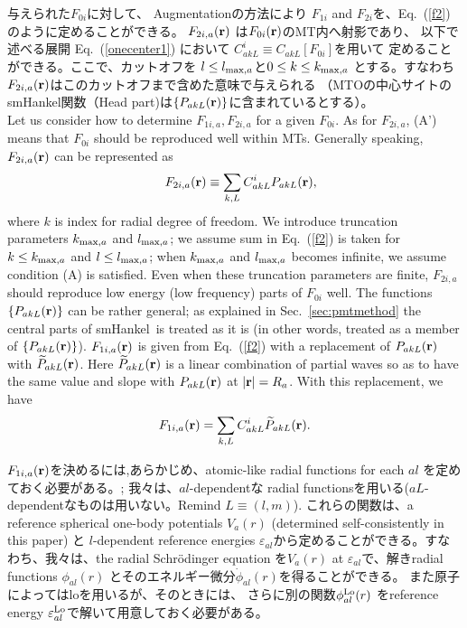 \documentclass[twocolumn,showpacs,preprintnumbers,amsmath,amssymb,floatfix]{revtex4-1}
\newcommand{\bfr}{{\bf r}}
\newcommand{\refeq}[1]{Eq.~(\ref{#1})}
\newcommand{\req}[1]{\mbox{Eq.~\!(\ref{#1})}}
\newcommand{\refsec}[1]{\mbox{Sec.~\!\ref{#1}}}
\def\eal{\varepsilon_{al}}
\def\eallo{\varepsilon^{\rm Lo}_{al}}
\def\smh{smHankel}
\def\wPakL{\widetilde{P}_{akL}}
\def\CiakL{C^i_{akL}}
\def\philo{{\phi}^{\rm Lo}_{al}}
\def\eal{\varepsilon_{al}}
\def\eallo{\varepsilon^{\rm Lo}_{al}}
\def\smh{smHankel}
\def\wPakL{\widetilde{P}_{akL}}
\def\CiakL{C^i_{akL}}
\def\philo{{\phi}^{\rm Lo}_{al}}
\begin{document}
与えられた$F_{0i}$に対して、
Augmentationの方法により $F_{1i}$ and $F_{2i}$を、\req{f2}のように定めることができる。
$F_{2i,a}(\bfr)$ は$F_{0i}(\bfr)$のMT内へ射影であり、
以下で述べる展開 \req{onecenter1} において $\CiakL\equiv C_{akL}[F_{0i}]$を用いて
定めることができる。ここで、カットオフを
$l\le l_{{\rm max},a}$と$0\le k\le k_{{\rm max},a}$ とする。すなわち
$F_{2i,a}(\bfr)$はこのカットオフまで含めた意味で与えられる
（MTOの中心サイトの\smh 関数（Head part)は$\{P_{akL}(\bfr)\}$に含まれているとする）。\\
Let us consider how to determine $F_{1i,a},F_{2i,a}$ for
a given $F_{0i}$. As for $F_{2i,a}$, (A') means that 
$F_{0i}$ should be reproduced well within MTs.
Generally speaking, $F_{2i,a}(\bfr)$ can be represented as
\begin{eqnarray}
&&F_{2i,a}(\bfr)\equiv \sum_{k,L} \CiakL P_{akL}(\bfr), \label{f2}
\end{eqnarray}
where $k$ is index for radial degree of freedom. 
We introduce truncation parameters
$k_{{\rm max},a}$ and $l_{{\rm max},a}$; we assume 
sum in \req{f2} is taken for $k\le k_{{\rm max},a}$ and $l \le l_{{\rm max},a}$;
when $k_{{\rm max},a}$ and $l_{{\rm max},a}$ becomes infinite, we assume
condition (A) is satisfied. Even when these truncation
parameters are finite, $F_{2i,a}$ should reproduce
low energy (low frequency) parts of $F_{0i}$ well. 
The functions $\{P_{akL}(\bfr)\}$ can be rather general; 
as explained in \refsec{sec:pmtmethod}
the central parts of \smh\ is treated as it is
(in other words, treated as a member of $\{P_{akL}(\bfr)\}$). %
$F_{1i,a}(\bfr)$ is given from \refeq{f2}
with a replacement of ${P}_{akL}(\bfr)$ with $\widetilde{P}_{akL}(\bfr)$.
Here $\widetilde{P}_{akL}(\bfr)$ is a linear combination of
partial waves so as to have the same value and slope with
${P}_{akL}(\bfr)$ at $|\bfr|=R_a$. With this replacement, we have 
\begin{eqnarray}
F_{1i,a}(\bfr) = \sum_{k,L} C^i_{akL} \wPakL(\bfr). \label{f1}
\end{eqnarray}

$F_{1i,a}(\bfr)$を決めるには,あらかじめ、atomic-like radial functions for
each $al$ を定めておく必要がある。; 我々は、$al$-dependentな
radial functionsを用いる($aL$-dependentなものは用いない。Remind $L\equiv(l,m)$).
これらの関数は、a reference spherical one-body potentials $V_a(r)$ (determined
self-consistently in this paper) と $l$-dependent reference energies
$\eal$から定めることができる。すなわち、我々は、the radial Schr\"odinger
equation を$V_a(r)$ at $\eal$で、解きradial functions $\phi_{al}(r)$
とそのエネルギー微分$\dot{\phi}_{al}(r)$を得ることができる。
また原子によってはloを用いるが、そのときには、
さらに別の関数$\philo(r)$ \cite{eal}をreference energy $\eallo$で解いて用意しておく必要がある。
\end{document}
